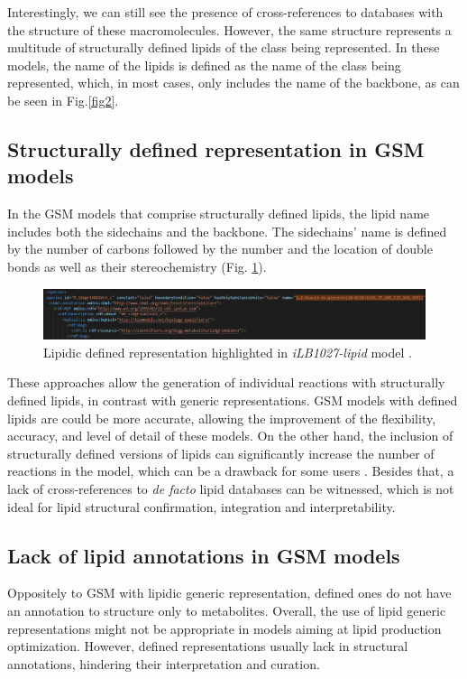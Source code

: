 \documentclass{llncs}
\begin{document}
Interestingly, we can still see the presence of cross-references to databases with the structure of these macromolecules. However, the same structure represents a multitude of structurally defined lipids of the class being represented. In these models, the name of the lipids is defined as the name of the class being represented, which, in most cases, only includes the name of the backbone, as can be seen in Fig.\ref{fig2}.

\subsection{Structurally defined representation in GSM models}
In the GSM models that comprise structurally defined lipids, the lipid name includes both the sidechains and the backbone. The sidechains' name is defined by the number of carbons followed by the number and the location of double bonds as well as their stereochemistry (Fig. \ref{fig3}).

\begin{figure}
    \includegraphics[width=\textwidth]{imagens/defenido.png}
    \caption{Lipidic defined representation highlighted in \textit{iLB1027-lipid} model \cite{Levering2016}.} \label{fig3}
\end{figure}

These approaches allow the generation of individual reactions with structurally defined lipids, in contrast with generic representations.
GSM models with defined lipids are could be more accurate, allowing the improvement of the flexibility, accuracy, and level of detail of these models. On the other hand, the inclusion of structurally defined versions of lipids can significantly increase the number of reactions in the model, which can be a drawback for some users \cite{Aung2013,Capela}.
Besides that, a lack of cross-references to \textit{de facto} lipid databases can be witnessed, which is not ideal for lipid structural confirmation, integration and interpretability.

\subsection{Lack of lipid annotations in GSM models}
 
Oppositely to GSM with lipidic generic representation, defined ones do not have an annotation to structure only to metabolites.
Overall, the use of lipid generic representations might not be appropriate in models aiming at lipid production optimization. 
However, defined representations usually lack in structural annotations, hindering their interpretation and curation.
\end{document}
